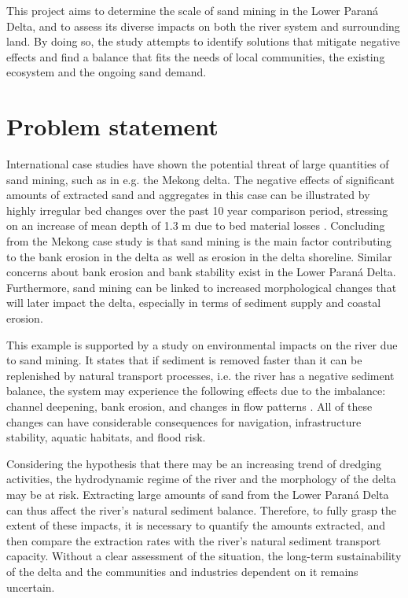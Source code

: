 This project aims to determine the scale of sand mining in the Lower Paraná Delta, and to assess its diverse impacts on both the river system and surrounding land. By doing so, the study attempts to identify solutions that mitigate negative effects and find a balance that fits the needs of local communities, the existing ecosystem and the ongoing sand demand.

\section{Problem statement}

International case studies have shown the potential threat of large quantities of sand mining, such as in e.g. the Mekong delta. The negative effects of significant amounts of extracted sand and aggregates in this case can be illustrated by highly irregular bed changes over the past 10 year comparison period, stressing on an increase of mean depth of 1.3 m due to bed material losses \autocite{brunierRecentMorphologicalChanges2014}. Concluding from the Mekong case study is that sand mining is the main factor contributing to the bank erosion in the delta as well as erosion in the delta shoreline. Similar concerns about bank erosion and bank stability exist in the Lower Paraná Delta. Furthermore, sand mining can be linked to increased morphological changes that will later impact the delta, especially in terms of sediment supply and coastal erosion.

This example is supported by a study on environmental impacts on the river due to sand mining. It states that if sediment is removed faster than it can be replenished by natural transport processes, i.e. the river has a negative sediment balance, the system may experience the following effects due to the imbalance: channel deepening, bank erosion, and changes in flow patterns \autocite{rentierEnvironmentalImpactsRiver2022}. All of these changes can have considerable consequences for navigation, infrastructure stability, aquatic habitats, and flood risk. 

Considering the hypothesis that there may be an increasing trend of dredging activities, the hydrodynamic regime of the river and the morphology of the delta may be at risk. Extracting large amounts of sand from the Lower Paraná Delta can thus affect the river's natural sediment balance. Therefore, to fully grasp the extent of these impacts, it is necessary to quantify the amounts extracted, and then compare the extraction rates with the river’s natural sediment transport capacity. Without a clear assessment of the situation, the long-term sustainability of the delta and the communities and industries dependent on it remains uncertain.

